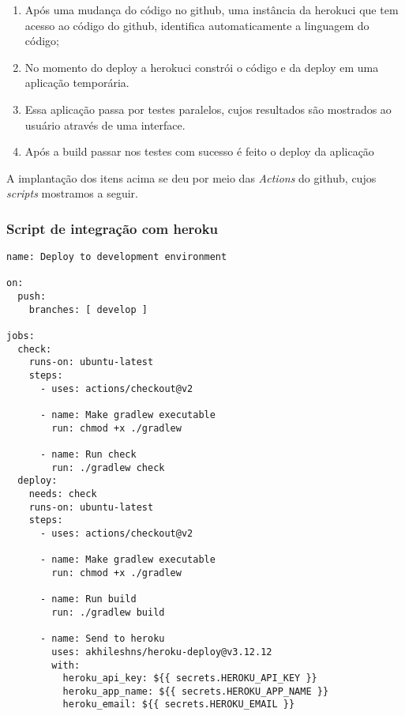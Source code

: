 \begin{enumerate}
    \item Após uma mudança do código no \gls{github}, uma instância da \gls{herokuci} que tem acesso ao código do \gls{github}, identifica automaticamente
    a linguagem do código; 
    \item No momento do \gls{deploy} a \gls{herokuci} constrói o código e da \gls{deploy} em uma aplicação temporária.
    \item Essa aplicação passa por testes paralelos, cujos resultados são mostrados ao usuário através de uma interface.
    \item Após a build passar nos testes com sucesso é feito o \gls{deploy} da aplicação 
\end{enumerate} 

A implantação dos itens acima se deu por meio das \emph{Actions} do \gls{github}, cujos \emph{scripts} mostramos a seguir.

\subsubsection{Script de integração com \gls{heroku}}
\begin{verbatim}
name: Deploy to development environment

on:
  push:
    branches: [ develop ]

jobs:
  check:
    runs-on: ubuntu-latest
    steps:
      - uses: actions/checkout@v2
      
      - name: Make gradlew executable
        run: chmod +x ./gradlew

      - name: Run check
        run: ./gradlew check
  deploy:
    needs: check
    runs-on: ubuntu-latest
    steps:
      - uses: actions/checkout@v2
      
      - name: Make gradlew executable
        run: chmod +x ./gradlew

      - name: Run build
        run: ./gradlew build

      - name: Send to heroku
        uses: akhileshns/heroku-deploy@v3.12.12
        with:
          heroku_api_key: ${{ secrets.HEROKU_API_KEY }}
          heroku_app_name: ${{ secrets.HEROKU_APP_NAME }}
          heroku_email: ${{ secrets.HEROKU_EMAIL }}
\end{verbatim}


